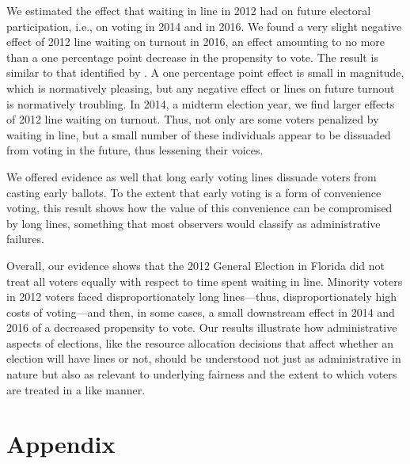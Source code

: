 \documentclass[12pt,titlepage]{article}
\begin{document}
We estimated the effect that waiting in line in 2012 had on future
electoral participation, i.e., on voting in 2014 and in 2016.  We
found a very slight negative effect of 2012 line waiting on turnout in
2016, an effect amounting to no more than a one percentage point
decrease in the propensity to vote. The result is similar to that
identified by \citet{pettigrew:racegapwaittimes}.  A one percentage
point effect is small in magnitude, which is normatively pleasing, but
any negative effect or lines on future turnout is normatively
troubling.  In 2014, a midterm election year, we find larger effects
of 2012 line waiting on turnout.  Thus, not only are some voters
penalized by waiting in line, but a small number of these individuals
appear to be dissuaded from voting in the future, thus lessening their
voices.

We offered evidence as well that long early voting lines dissuade
voters from casting early ballots.  To the extent that early voting is
a form of convenience voting, this result shows how the value of this
convenience can be compromised by long lines, something that most
observers would classify as administrative failures.

Overall, our evidence shows that the 2012 General Election in Florida
did not treat all voters equally with respect to time spent waiting in
line.  Minority voters in 2012 voters faced disproportionately long
lines---thus, disproportionately high costs of voting---and then, in
some cases, a small downstream effect in 2014 and 2016 of a decreased
propensity to vote.  Our results illustrate how administrative aspects
of elections, like the resource allocation decisions that affect
whether an election will have lines or not, should be understood not
just as administrative in nature but also as relevant to underlying
fairness and the extent to which voters are treated in a like manner.




% 

\clearpage
\newpage




\newpage
\appendix
\section*{Appendix}


\end{document}
